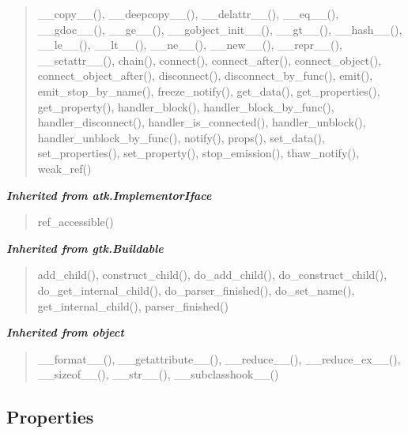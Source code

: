 \begin{quote}
\_\_copy\_\_(), \_\_deepcopy\_\_(), \_\_delattr\_\_(), \_\_eq\_\_(), \_\_gdoc\_\_(), \_\_ge\_\_(), \_\_gobject\_init\_\_(), \_\_gt\_\_(), \_\_hash\_\_(), \_\_le\_\_(), \_\_lt\_\_(), \_\_ne\_\_(), \_\_new\_\_(), \_\_repr\_\_(), \_\_setattr\_\_(), chain(), connect(), connect\_after(), connect\_object(), connect\_object\_after(), disconnect(), disconnect\_by\_func(), emit(), emit\_stop\_by\_name(), freeze\_notify(), get\_data(), get\_properties(), get\_property(), handler\_block(), handler\_block\_by\_func(), handler\_disconnect(), handler\_is\_connected(), handler\_unblock(), handler\_unblock\_by\_func(), notify(), props(), set\_data(), set\_properties(), set\_property(), stop\_emission(), thaw\_notify(), weak\_ref()
\end{quote}

\large{\textbf{\textit{Inherited from atk.ImplementorIface}}}

\begin{quote}
ref\_accessible()
\end{quote}

\large{\textbf{\textit{Inherited from gtk.Buildable}}}

\begin{quote}
add\_child(), construct\_child(), do\_add\_child(), do\_construct\_child(), do\_get\_internal\_child(), do\_parser\_finished(), do\_set\_name(), get\_internal\_child(), parser\_finished()
\end{quote}

\large{\textbf{\textit{Inherited from object}}}

\begin{quote}
\_\_format\_\_(), \_\_getattribute\_\_(), \_\_reduce\_\_(), \_\_reduce\_ex\_\_(), \_\_sizeof\_\_(), \_\_str\_\_(), \_\_subclasshook\_\_()
\end{quote}


  \subsection{Properties}

